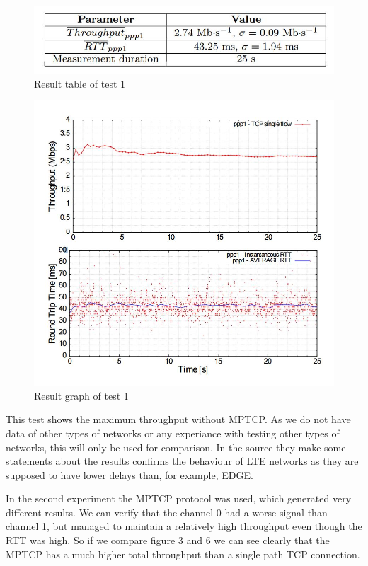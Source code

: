 \documentclass[11pt,twocolumn]{article}
\begin{document}
\begin{figure}[ht]
\begin{center}
\includegraphics[scale=0.6]{table_1}
\caption{Result table of test 1}
\end{center}
\end{figure}
\begin{figure}[ht]
\begin{center}
\includegraphics[scale=0.5]{graph_1}
\caption{Result graph of test 1}
\end{center}
\end{figure}

This test shows the maximum throughput without MPTCP. As we do not have data of other types of networks or any experiance with testing other types of networks, this will only be used for comparison. In the source they make some statements about the results confirms the behaviour of LTE networks as they are supposed to have lower delays than, for example, EDGE. 

In the second experiment the MPTCP protocol was used, which generated very different results. We can verify that the channel 0 had a worse signal than channel 1, but managed to maintain a relatively high throughput even though the RTT was high. So if we compare figure 3 and 6 we can see clearly that the MPTCP has a much higher total throughput than a single path TCP connection.
\end{document}
